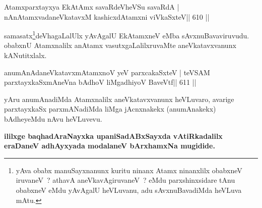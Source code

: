 \begin{shl}
Atamxparxtayxya EkAtAmx savaRdeVheVSu savaRdA |
nAnAtamxvadaneVkatavxM kashicxdAtamxni viVkaSxteV\hfill || 610 ||
\end{shl}

\begin{artha}
samasatx\footnote{yAva obabx manuSayxnanunx kuritu ninanx Atamx ninanxlilx obabxneV iruvaneV~? athavA aneVkavAgiruvaneV~? eMdu parxshinxsidare tAnu obabxneV eMdu yAvAgalU heVLuvanu, adu sAvxnuBavadiMda heVLuva mAtu.}deVhagaLalUlx yAvAgalU EkAtamxneV eMba sAvxnuBavaviruvudu. obabxnU Atamxnalilx anAtamx vasutxgaLalilxruvaMte aneVkatavxvanunx kANutitxlalx.
\end{artha}

\begin{shl}
anumAnAdaneVkatavxmAtamxnoV yeV parxcakaSxteV |
teVSAM parxtayxkaSxmAneVna bAdhoV liMgadhiyoV BaveVtf\hfill || 611 ||
\end{shl}

\begin{artha}
yAru anumAnadiMda Atamxnalilx aneVkatavxvanunx heVLuvaro, avarige parxtayxkaSx parxmANadiMda liMga jAcnxnakekx (anumAnakekx) bAdheyeMdu nAvu heVLuvevu.
\end{artha}


\begin{center}

{\textbf{ililxge baqhadAraNayxka upaniSadABxSayxda vAtiRkadalilx eraDaneV adhAyxyada modalaneV bArxhamxNa mugidide.}}
\end{center}
